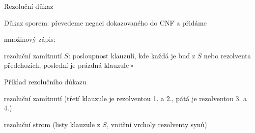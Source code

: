\documentclass{beamer}
\begin{document}
\begin{frame}{Rezoluční důkaz}

    Důkaz sporem: převedeme \alert{negaci} dokazovaného do CNF a přidáme



    množinový zápis:

    \medskip

    
    \medskip

    \alert{rezoluční zamítnutí $S$}: posloupnost klauzulí, kde každá je buď z $S$ nebo rezolventa předchozích, poslední je prázdná klauzule $\square$


\end{frame}


\begin{frame}{Příklad rezolučního důkazu}

    \alert{rezoluční zamítnutí} (třetí klauzule je rezolventou 1. a 2., pátá je rezolventou 3. a 4.)


    \bigskip

    \alert{rezoluční strom} (listy klauzule z $S$, vnitřní vrcholy rezolventy synů) 


\end{frame}
\end{document}
